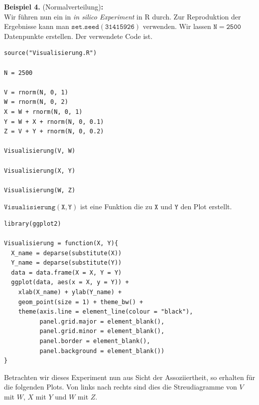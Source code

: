\documentclass[headsepline,11pt,bibliography=leveldown]{scrbook}
\newcounter{NewZaehler}
\newcommand{\NewZahl}{\refstepcounter{NewZaehler}4.\theNewZaehler}
\newenvironment{NewBeispiel}[1]{\par\medskip\textbf{Beispiel \NewZahl} #1\textbf{:}\\}{\par\medskip}
\begin{document}
\begin{NewBeispiel}{(Normalverteilung)}
Wir führen nun ein in \textit{in silico Experiment} in R durch. Zur Reproduktion der Ergebnisse kann man $\mathtt{set.seed(31415926)}$ verwenden. Wir lassen $\mathtt{N = 2500}$ Datenpunkte erstellen. Der verwendete Code ist.
\begin{lstlisting}
source("Visualisierung.R")

N = 2500

V = rnorm(N, 0, 1)
W = rnorm(N, 0, 2)
X = W + rnorm(N, 0, 1)
Y = W + X + rnorm(N, 0, 0.1)
Z = V + Y + rnorm(N, 0, 0.2)

Visualisierung(V, W)

Visualisierung(X, Y)

Visualisierung(W, Z)
\end{lstlisting}
$\mathtt{Visualisierung(X, Y)}$ ist eine Funktion die zu $\mathtt{X}$ und $\mathtt{Y}$ den Plot erstellt.
\begin{lstlisting}
library(ggplot2)

Visualisierung = function(X, Y){
  X_name = deparse(substitute(X))
  Y_name = deparse(substitute(Y))
  data = data.frame(X = X, Y = Y)
  ggplot(data, aes(x = X, y = Y)) +
    xlab(X_name) + ylab(Y_name) +
    geom_point(size = 1) + theme_bw() +
    theme(axis.line = element_line(colour = "black"),
          panel.grid.major = element_blank(),
          panel.grid.minor = element_blank(),
          panel.border = element_blank(),
          panel.background = element_blank())
}
\end{lstlisting}

Betrachten wir dieses Experiment nun aus Sicht der Assoziiertheit, so erhalten für die folgenden Plots. Von links nach rechts sind dies die Streudiagramme von $V$ mit $W$, $X$ mit $Y$ und $W$ mit $Z$.\\


\end{NewBeispiel}
\end{document}
